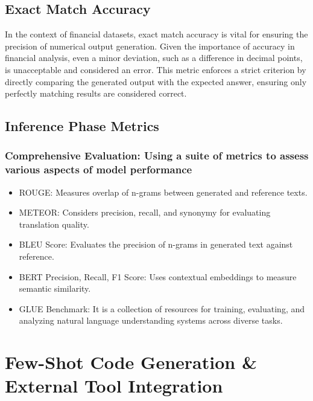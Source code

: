 \documentclass[logo,msc]{infthesis}           %
\begin{document}
\subsection{Exact Match Accuracy}
In the context of financial datasets, exact match accuracy is vital for ensuring the precision of numerical output generation. Given the importance of accuracy in financial analysis, even a minor deviation, such as a difference in decimal points, is unacceptable and considered an error. This metric enforces a strict criterion by directly comparing the generated output with the expected answer, ensuring only perfectly matching results are considered correct. 
\subsection{Inference Phase Metrics}
\subsubsection{Comprehensive Evaluation: Using a suite of metrics to assess various aspects of model performance}
\begin{itemize}
    \item ROUGE: Measures overlap of n-grams between generated and reference texts.
    \item METEOR: Considers precision, recall, and synonymy for evaluating translation quality.
    \item BLEU Score: Evaluates the precision of n-grams in generated text against reference.
    \item BERT Precision, Recall, F1 Score: Uses contextual embeddings to measure semantic similarity.
    \item GLUE Benchmark: It is a collection of resources for training, evaluating, and analyzing natural language understanding systems across diverse tasks.
\end{itemize}
\section{Few-Shot Code Generation \& External Tool Integration}
\end{document}
